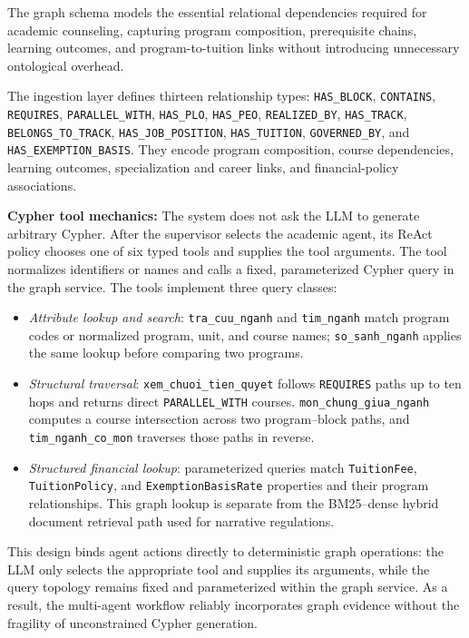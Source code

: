 The graph schema models the essential relational dependencies required for academic counseling, capturing program composition, prerequisite chains, learning outcomes, and program-to-tuition links without introducing unnecessary ontological overhead.

The ingestion layer defines thirteen relationship types: \texttt{HAS\_BLOCK}, \texttt{CONTAINS}, \texttt{REQUIRES}, \texttt{PARALLEL\_WITH}, \texttt{HAS\_PLO}, \texttt{HAS\_PEO}, \texttt{REALIZED\_BY}, \texttt{HAS\_TRACK}, \texttt{BELONGS\_TO\_TRACK}, \texttt{HAS\_JOB\_POSITION}, \texttt{HAS\_TUITION}, \texttt{GOVERNED\_BY}, and \texttt{HAS\_EXEMPTION\_BASIS}. They encode program composition, course dependencies, learning outcomes, specialization and career links, and financial-policy associations.

\textbf{Cypher tool mechanics:}
The system does not ask the LLM to generate arbitrary Cypher. After the supervisor selects the academic agent, its ReAct policy chooses one of six typed tools and supplies the tool arguments. The tool normalizes identifiers or names and calls a fixed, parameterized Cypher query in the graph service. The tools implement three query classes:
\begin{itemize}
    \item \emph{Attribute lookup and search}: \texttt{tra\_cuu\_nganh} and \texttt{tim\_nganh} match program codes or normalized program, unit, and course names; \texttt{so\_sanh\_nganh} applies the same lookup before comparing two programs.
    \item \emph{Structural traversal}: \texttt{xem\_chuoi\_tien\_quyet} follows \texttt{REQUIRES} paths up to ten hops and returns direct \texttt{PARALLEL\_WITH} courses. \texttt{mon\_chung\_giua\_nganh} computes a course intersection across two program--block paths, and \texttt{tim\_nganh\_co\_mon} traverses those paths in reverse.
    \item \emph{Structured financial lookup}: parameterized queries match \texttt{TuitionFee}, \texttt{TuitionPolicy}, and \texttt{ExemptionBasisRate} properties and their program relationships. This graph lookup is separate from the BM25--dense hybrid document retrieval path used for narrative regulations.
\end{itemize}
This design binds agent actions directly to deterministic graph operations: the LLM only selects the appropriate tool and supplies its arguments, while the query topology remains fixed and parameterized within the graph service. As a result, the multi-agent workflow reliably incorporates graph evidence without the fragility of unconstrained Cypher generation.

